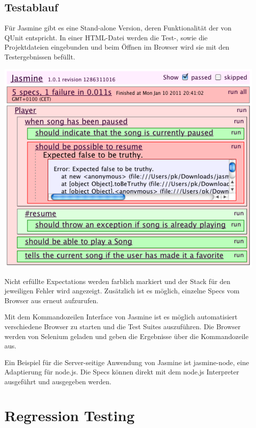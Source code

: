 \documentclass[11pt, a4paper]{article}
\begin{document}
\subsection{Testablauf}

Für Jasmine gibt es eine Stand-alone Version, deren Funktionalität der von QUnit
entspricht. In einer HTML-Datei werden die Test-, sowie die Projektdateien
eingebunden und beim Öffnen im Browser wird sie mit den Testergebnissen befüllt.

\begin{center}
  \includegraphics[width = 1\textwidth]{Jasmine.png}
\end{center}

Nicht erfüllte Expectations werden farblich markiert und der Stack für den
jeweiligen Fehler wird angezeigt. Zusätzlich ist es möglich, einzelne Specs vom
Browser aus erneut aufzurufen.

Mit dem Kommandozeilen Interface von Jasmine ist es möglich automatisiert
verschiedene Browser zu starten und die Test Suites auszuführen. Die Browser
werden von Selenium\cite{selenium_selenium_2011} geladen und geben die
Ergebnisse über die Kommandozeile aus.

Ein Beispiel für die Server-seitige Anwendung von Jasmine ist
jasmine-node\cite{hevery_jasmine-node_2011}, eine Adaptierung für node.js. Die
Specs können direkt mit dem node.js Interpreter ausgeführt und ausgegeben
werden.

\section{Regression Testing}
\end{document}
